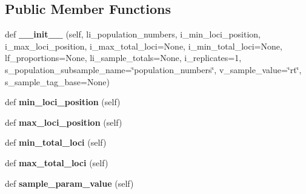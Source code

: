 \subsection*{Public Member Functions}
\begin{DoxyCompactItemize}
\item 
def {\bfseries \+\_\+\+\_\+init\+\_\+\+\_\+} (self, li\+\_\+population\+\_\+numbers, i\+\_\+min\+\_\+loci\+\_\+position, i\+\_\+max\+\_\+loci\+\_\+position, i\+\_\+max\+\_\+total\+\_\+loci=None, i\+\_\+min\+\_\+total\+\_\+loci=None, lf\+\_\+proportions=None, li\+\_\+sample\+\_\+totals=None, i\+\_\+replicates=1, s\+\_\+population\+\_\+subsample\+\_\+name=\char`\"{}population\+\_\+numbers\char`\"{}, v\+\_\+sample\+\_\+value=\char`\"{}rt\char`\"{}, s\+\_\+sample\+\_\+tag\+\_\+base=None)\hypertarget{classnegui_1_1genepopfilesampler_1_1GenepopFileSampleParamsLoci_abae84ffce06e7bfe793e4eab12176e9d}{}\label{classnegui_1_1genepopfilesampler_1_1GenepopFileSampleParamsLoci_abae84ffce06e7bfe793e4eab12176e9d}

\item 
def {\bfseries min\+\_\+loci\+\_\+position} (self)\hypertarget{classnegui_1_1genepopfilesampler_1_1GenepopFileSampleParamsLoci_a538126db0b2cbb0070d90fd82e846e95}{}\label{classnegui_1_1genepopfilesampler_1_1GenepopFileSampleParamsLoci_a538126db0b2cbb0070d90fd82e846e95}

\item 
def {\bfseries max\+\_\+loci\+\_\+position} (self)\hypertarget{classnegui_1_1genepopfilesampler_1_1GenepopFileSampleParamsLoci_a35010147e4f3dc839fcc7bc3d6f31e3b}{}\label{classnegui_1_1genepopfilesampler_1_1GenepopFileSampleParamsLoci_a35010147e4f3dc839fcc7bc3d6f31e3b}

\item 
def {\bfseries min\+\_\+total\+\_\+loci} (self)\hypertarget{classnegui_1_1genepopfilesampler_1_1GenepopFileSampleParamsLoci_ad3b3944904c30ac3b4b5760f48b223b4}{}\label{classnegui_1_1genepopfilesampler_1_1GenepopFileSampleParamsLoci_ad3b3944904c30ac3b4b5760f48b223b4}

\item 
def {\bfseries max\+\_\+total\+\_\+loci} (self)\hypertarget{classnegui_1_1genepopfilesampler_1_1GenepopFileSampleParamsLoci_afd60b83e499e8fe3ab17d1248f970490}{}\label{classnegui_1_1genepopfilesampler_1_1GenepopFileSampleParamsLoci_afd60b83e499e8fe3ab17d1248f970490}

\item 
def {\bfseries sample\+\_\+param\+\_\+value} (self)\hypertarget{classnegui_1_1genepopfilesampler_1_1GenepopFileSampleParamsLoci_a19285822eed17d73e84c74b82179de3c}{}\label{classnegui_1_1genepopfilesampler_1_1GenepopFileSampleParamsLoci_a19285822eed17d73e84c74b82179de3c}


\end{DoxyCompactItemize}
